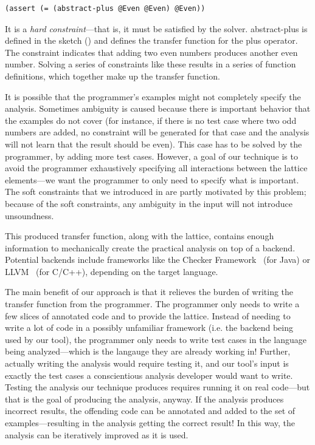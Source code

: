 \documentclass[10pt,conference]{IEEEtran}
\begin{document}
\lstset{language=[]Lisp}
\begin{lstlisting}[columns=fullflexible]
(assert (= (abstract-plus @Even @Even) @Even))
\end{lstlisting}
\lstset{language=C}

It is a \textit{hard constraint}---that is, it must be satisfied
by the solver.
abstract-plus is defined in the sketch () and defines
the transfer function for the plus operator.
The constraint indicates that
adding two even numbers produces another even number. Solving a series of
constraints like these
results in a series of function definitions, which together
make up the transfer function.

It is possible that the programmer's
examples might not completely specify the analysis. Sometimes
ambiguity is caused because there is important behavior that the
examples do not cover (for instance, if there is no test case where
two odd numbers are added, no constraint will be generated for that
case and the analysis will not learn that the result should be even).
This case has to be solved by the programmer, by adding more test cases.
However, a goal of our technique is to avoid the programmer exhaustively
specifying all interactions between the lattice elements---we want the
programmer to only need to specify what is important. The soft constraints
that we introduced in  are partly motivated by this problem;
because of the soft constraints, any ambiguity in the input will not
introduce unsoundness.

This produced transfer function, along with the lattice,
contains enough information to mechanically create the practical
analysis on top of a backend. Potential backends include frameworks like the
Checker Framework~\cite{checker-framework} (for Java)
or LLVM~\cite{lattner04:_llvm} (for C/C++),
depending on the target language.

The main benefit of our approach is that it relieves the burden of
writing the transfer function from the programmer. The programmer
only needs to write a few slices of annotated code and to provide
the lattice. Instead of
needing to write a lot of code in a possibly unfamiliar framework
(i.e. the backend being used by our tool), the programmer only needs to
write test cases in the language being analyzed---which is the langauge
they are already working in! Further, actually writing the analysis
would require testing it, and our tool's input is exactly the test
cases a conscientious analysis developer would want to write.
Testing the analysis our technique produces requires running it on
real code---but that is the goal of producing the analysis, anyway.
If the analysis produces incorrect results, the offending code can be
annotated and added to the set of examples---resulting in the analysis
getting the correct result! In this way, the analysis can be iteratively
improved as it is used.
\end{document}
